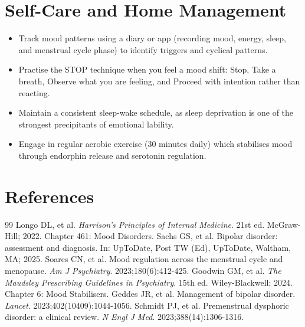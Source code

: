 \section*{Self-Care and Home Management}
\begin{itemize}
  \item Track mood patterns using a diary or app (recording mood, energy, sleep, and menstrual cycle phase) to identify triggers and cyclical patterns.
  \item Practise the STOP technique when you feel a mood shift: Stop, Take a breath, Observe what you are feeling, and Proceed with intention rather than reacting.
  \item Maintain a consistent sleep-wake schedule, as sleep deprivation is one of the strongest precipitants of emotional lability.
  \item Engage in regular aerobic exercise (30 minutes daily) which stabilises mood through endorphin release and serotonin regulation.
\end{itemize}

\section*{References}

\begin{thebibliography}{99}
 Longo DL, et al. \emph{Harrison's Principles of Internal Medicine}. 21st ed. McGraw-Hill; 2022. Chapter 461: Mood Disorders.
 Sachs GS, et al. Bipolar disorder: assessment and diagnosis. In: UpToDate, Post TW (Ed), UpToDate, Waltham, MA; 2025.
 Soares CN, et al. Mood regulation across the menstrual cycle and menopause. \emph{Am J Psychiatry}. 2023;180(6):412-425.
 Goodwin GM, et al. \emph{The Maudsley Prescribing Guidelines in Psychiatry}. 15th ed. Wiley-Blackwell; 2024. Chapter 6: Mood Stabilisers.
 Geddes JR, et al. Management of bipolar disorder. \emph{Lancet}. 2023;402(10409):1044-1056.
 Schmidt PJ, et al. Premenstrual dysphoric disorder: a clinical review. \emph{N Engl J Med}. 2023;388(14):1306-1316.
\end{thebibliography}
